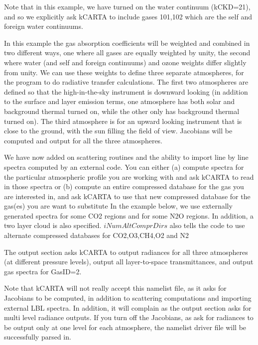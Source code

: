 \documentclass[12pt]{article}
\newcommand{\kc}{\textsf{kCARTA}\xspace}
\begin{document}
Note that in this example, we have turned on the water continuum (kCKD=21),
and so we explicitly ask \kc to include gases 101,102 which are the self and 
foreign water continuums.

In this example the gas absorption coefficients will be weighted and
combined in two  different ways, one where all gases are equally
weighted by unity, the second where water (and self and foreign continuums) 
and ozone weights differ slightly from unity. We can use these weights to 
define three separate atmospheres, for the program to do radiative transfer
calculations. The first two atmospheres are defined
so that the high-in-the-sky instrument is downward looking (in
addition to the surface and layer emission terms, one atmosphere has
both solar and background thermal turned on, while the other only
has background thermal turned on).  The third atmosphere is for an
upward looking instrument that is close to the ground, with the sun
filling the field of view.  Jacobians will be computed and output
for all the three atmospheres.

We have now added on scattering routines and the ability to import line by 
line spectra computed by an external code. You can either \newline
(a) compute spectra for the particular atmospheric profile you are working with
    and ask \kc to read in those spectra or \newline
(b) compute an entire compressed database for the gas you are interested in,
    and ask \kc to use that new compressed database for the gas(es) you are
    want to substitute \newline
In the example below, we use 
externally generated spectra for some CO2 regions and for some N2O regions. 
In addition, a two layer cloud is also specified. $iNumAltComprDirs$ also 
tells the code to use alternate compressed databases for CO2,O3,CH4,O2 and N2

The output section asks \kc to output radiances for all three
atmospheres (at different pressure levels), output all layer-to-space
transmittances, and output gas spectra for GasID=2.  

Note that \kc will not really accept this namelist file, as it asks for
Jacobians to be computed, in addition to scattering computations and 
importing external LBL spectra. In addition, it will complain as the output
section asks for multi level radiance outputs. If you turn off the Jacobians, 
as ask for radiances to be output only at one level for each atmosphere, 
the namelist driver file will be successfully parsed in.
\end{document}
